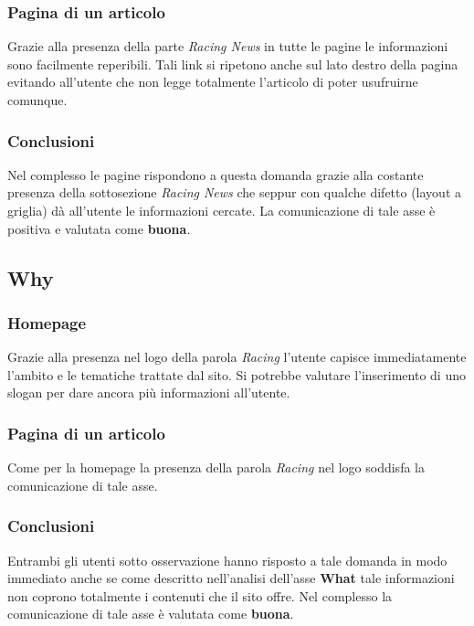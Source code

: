 		\subsubsection{Pagina di un articolo}
			Grazie alla presenza della parte \textit{Racing News} in tutte le pagine le informazioni sono facilmente reperibili. Tali link si ripetono anche sul lato destro della pagina evitando all'utente che non legge totalmente l'articolo di poter usufruirne comunque.
			
		\subsubsection{Conclusioni}
			Nel complesso le pagine rispondono a questa domanda grazie alla costante presenza della sottosezione \textit{Racing News} che seppur con qualche difetto (layout a griglia) dà all'utente le informazioni cercate. La comunicazione di tale asse è positiva e valutata come \textbf{buona}.
		
	\subsection*{Why}
	
		\subsubsection{Homepage}
			Grazie alla presenza nel logo della parola \textit{Racing} l'utente capisce immediatamente l'ambito e le tematiche trattate dal sito. Si potrebbe valutare l'inserimento di uno slogan per dare ancora più informazioni all'utente.
			
		\subsubsection{Pagina di un articolo}
			Come per la homepage la presenza della parola \textit{Racing} nel logo soddisfa la comunicazione di tale asse.
			
		\subsubsection{Conclusioni}
			Entrambi gli utenti sotto osservazione hanno risposto a tale domanda in modo immediato anche se come descritto nell'analisi dell'asse \textbf{What} tale informazioni non coprono totalmente i contenuti che il sito offre. Nel complesso la comunicazione di tale asse è valutata come \textbf{buona}.
			
